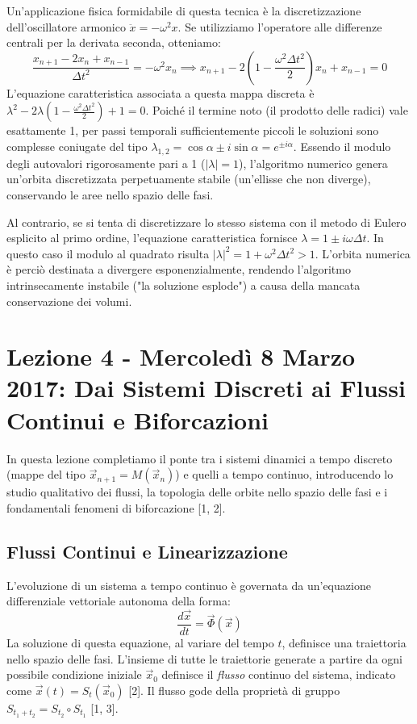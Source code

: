 \documentclass[12pt,a4paper]{article}
\begin{document}
Un'applicazione fisica formidabile di questa tecnica è la discretizzazione dell'oscillatore armonico $\ddot{x} = -\omega^2 x$. Se utilizziamo l'operatore alle differenze centrali per la derivata seconda, otteniamo:
\begin{equation}
\frac{x_{n+1} - 2x_n + x_{n-1}}{\Delta t^2} = -\omega^2 x_n \implies x_{n+1} - 2\left(1 - \frac{\omega^2 \Delta t^2}{2}\right)x_n + x_{n-1} = 0
\end{equation}
L'equazione caratteristica associata a questa mappa discreta è $\lambda^2 - 2\lambda\left(1 - \frac{\omega^2 \Delta t^2}{2}\right) + 1 = 0$.
Poiché il termine noto (il prodotto delle radici) vale esattamente 1, per passi temporali sufficientemente piccoli le soluzioni sono complesse coniugate del tipo $\lambda_{1,2} = \cos \alpha \pm i \sin \alpha = e^{\pm i \alpha}$.
Essendo il modulo degli autovalori rigorosamente pari a 1 ($|\lambda| = 1$), l'algoritmo numerico genera un'orbita discretizzata perpetuamente stabile (un'ellisse che non diverge), conservando le aree nello spazio delle fasi.

Al contrario, se si tenta di discretizzare lo stesso sistema con il metodo di Eulero esplicito al primo ordine, l'equazione caratteristica fornisce $\lambda = 1 \pm i \omega \Delta t$. In questo caso il modulo al quadrato risulta $|\lambda|^2 = 1 + \omega^2 \Delta t^2 > 1$. L'orbita numerica è perciò destinata a divergere esponenzialmente, rendendo l'algoritmo intrinsecamente instabile ("la soluzione esplode") a causa della mancata conservazione dei volumi.

\newpage
\section{Lezione 4 - Mercoledì 8 Marzo 2017: Dai Sistemi Discreti ai Flussi Continui e Biforcazioni}

In questa lezione completiamo il ponte tra i sistemi dinamici a tempo discreto (mappe del tipo $\vec{x}_{n+1} = M(\vec{x}_n)$) e quelli a tempo continuo, introducendo lo studio qualitativo dei flussi, la topologia delle orbite nello spazio delle fasi e i fondamentali fenomeni di biforcazione [1, 2].

\subsection{Flussi Continui e Linearizzazione}
L'evoluzione di un sistema a tempo continuo è governata da un'equazione differenziale vettoriale autonoma della forma:
\begin{equation}
\frac{d\vec{x}}{dt} = \vec{\Phi}(\vec{x})
\end{equation}
La soluzione di questa equazione, al variare del tempo $t$, definisce una traiettoria nello spazio delle fasi. L'insieme di tutte le traiettorie generate a partire da ogni possibile condizione iniziale $\vec{x}_0$ definisce il \textit{flusso} continuo del sistema, indicato come $\vec{x}(t) = S_t(\vec{x}_0)$ [2]. Il flusso gode della proprietà di gruppo $S_{t_1+t_2} = S_{t_2} \circ S_{t_1}$ [1, 3].
\end{document}

